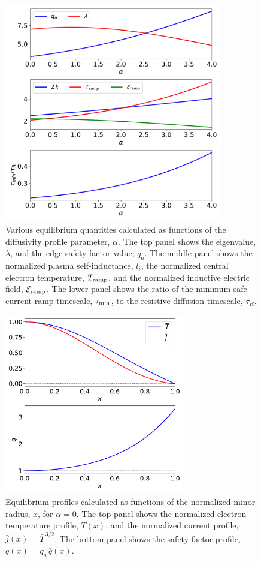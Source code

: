 \documentclass{iopjournal}
\begin{document}
\begin{figure}
\centerline{\includegraphics[width=0.85\textwidth]{Figure2.pdf}}
\caption{Various equilibrium quantities calculated as functions of the diffusivity profile parameter, $\alpha$.
The top panel shows the eigenvalue, $\lambda$, and the edge safety-factor value, $q_a$. 
The middle panel shows the normalized plasma self-inductance, $l_i$, the normalized central electron temperature, $T_{\rm ramp}$,
and the normalized inductive electric field, ${\cal E}_{\rm ramp}$. The lower panel shows the ratio of the minimum safe current ramp
timescale, $\tau_{\rm min}$, to the resistive diffusion timescale, $\tau_R$. }\label{fig2}
\end{figure}

\begin{figure}
\centerline{\includegraphics[width=0.7\textwidth]{Figure3.pdf}}
\caption{Equilibrium profiles calculated as functions of the normalized minor radius, $x$, for $\alpha=0$.  The top panel shows the normalized electron temperature profile, $\bar{T}(x)$, and the
normalized current profile, $\bar{j}(x)= \bar{T}^{\,3/2}$.  The bottom panel shows the safety-factor profile, $q(x)= q_a\,\bar{q}(x)$. }\label{fig3}
\end{figure}
\end{document}
